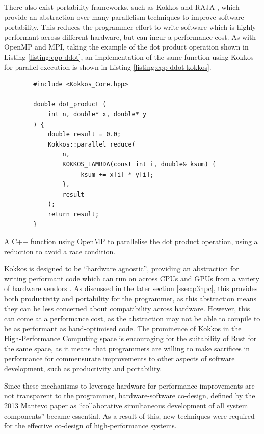 There also exist portability frameworks, such as Kokkos \cite{edwardsKokkosEnablingPerformance2013} and RAJA \cite{RAJAPortabilitySuite}, which provide an abstraction over many parallelism techniques to improve software portability. This reduces the programmer effort to write software which is highly performant across different hardware, but can incur a performance cost. As with OpenMP and MPI, taking the example of the dot product operation shown in Listing \ref{listing:cpp-ddot}, an implementation of the same function using Kokkos for parallel execution is shown in Listing \ref{listing:cpp-ddot-kokkos}.

\begin{code}
    \begin{verbatim}
        #include <Kokkos_Core.hpp>
        
        double dot_product (
            int n, double* x, double* y
        ) {
            double result = 0.0;
            Kokkos::parallel_reduce(
                n,
                KOKKOS_LAMBDA(const int i, double& ksum) {
                     ksum += x[i] * y[i];
                },
                result
            );
            return result;
        }
    \end{verbatim}
    \caption{A C++ function using OpenMP to parallelise the dot product operation, using a reduction to avoid a race condition.}
    \label{listing:cpp-ddot-kokkos}
\end{code}

Kokkos is designed to be ``hardware agnostic'', providing an abstraction for writing performant code which can run on across CPUs and GPUs from a variety of hardware vendors \cite{KokkosEcosystem}. As discussed in the later section \ref{ssec:p3hpc}, this provides both productivity and portability for the programmer, as this abstraction means they can be less concerned about compatibility across hardware. However, this can come at a performance cost, as the abstraction may not be able to compile to be as performant as hand-optimised code. The prominence of Kokkos in the High-Performance Computing space is encouraging for the suitability of Rust for the same space, as it means that programmers are willing to make sacrifices in performance for commensurate improvements to other aspects of software development, such as productivity and portability.

Since these mechanisms to leverage hardware for performance improvements are not transparent to the programmer, hardware-software co-design, defined by the 2013 Mantevo paper as ``collaborative simultaneous development of all system components'' \cite{heroux2013mantevo} became essential. As a result of this, new techniques were required for the effective co-design of high-performance systems.

